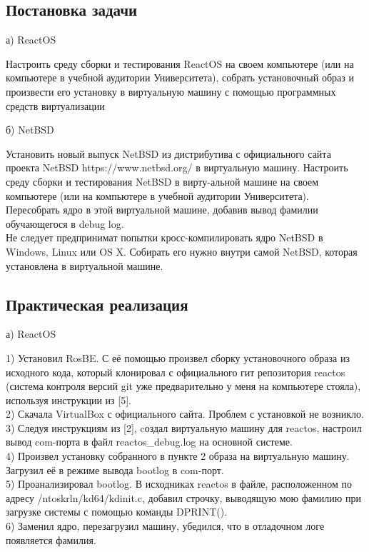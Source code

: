 \documentclass[a4paper, 14pt]{extarticle}
\begin{document}
\newpage
\begin{center}
\section{Постановка задачи}
а) ReactOS
\end{center}
Настроить среду сборки и тестирования ReactOS на своем компьютере (или на компьютере в учебной аудитории Университета), собрать установочный образ и произвести его установку в виртуальную машину с помощью программных средств виртуализации

\begin{center}
б) NetBSD
\end{center}
Установить новый выпуск NetBSD из дистрибутива с официального сайта  проекта  NetBSD  https://www.netbsd.org/ в  виртуальную машину. Настроить среду сборки и тестирования NetBSD в вирту-альной машине на своем компьютере (или на компьютере в учебной аудитории Университета). Пересобрать ядро в этой виртуальной машине, добавив вывод фамилии обучающегося в debug log.\\
Не следует предпринимат попытки кросс-компилировать ядро NetBSD в Windows, Linux или OS X. Собирать его нужно внутри самой NetBSD, которая установлена в виртуальной машине.

\vspace{0.1em}


\newpage
\vspace{2em}
\begin{center}
\section{Практическая реализация}\label{Sect::res}
а) ReactOS
\end{center}
1) Установил RosBE. С её помощью произвел сборку установочного
образа из исходного кода, который клонировал с официального гит
репозитория reactos (система контроля версий git уже предварительно
у меня на компьютере стояла), используя инструкции из [5].\\
2) Скачала VirtualBox с официального сайта. Проблем с установкой не
возникло.\\
3) Следуя инструкциям из [2], cоздал виртуальную машину для reactos,
настроил вывод com-порта в файл reactos\_debug.log на основной системе.\\
4) Произвел установку собранного в пункте 2 образа на виртуальную
машину. Загрузил её в режиме вывода bootlog в com-порт.\\
5) Проанализировал bootlog. В исходниках reactos в файле,
расположенном по адресу /ntoskrln/kd64/kdinit.c, добавил строчку,
выводящую мою фамилию при загрузке системы с помощью команды
DPRINT().\\
6) Заменил ядро, перезагрузил машину, убедился, что в отладочном логе
появляется фамилия.\\
\end{document}
